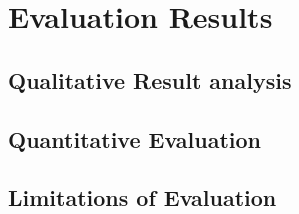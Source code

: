 \section{Evaluation Results}

\subsection{Qualitative Result analysis}

\subsection{Quantitative Evaluation}

\subsection{Limitations of Evaluation}
